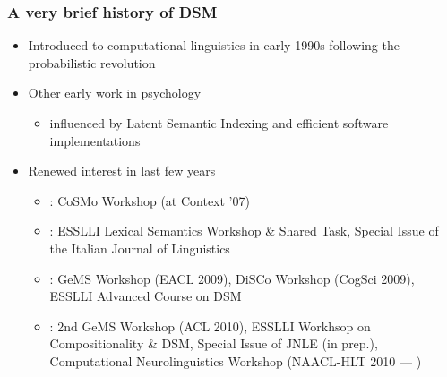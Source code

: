 \begin{frame}
  \frametitle{A very brief history of DSM}

  \begin{itemize}
  \item Introduced to computational linguistics in early 1990s
    following the probabilistic revolution \citep{Schuetze:92,Schuetze:98}
  \item Other early work in psychology \citep{Landauer:Dumais:97,Lund:Burgess:96}
    \begin{itemize}
    \item[\hand] influenced by Latent Semantic Indexing \citep{Dumais:etc:88} and efficient software implementations \citep{Berry:92}
    \end{itemize}
  \item<2-> Renewed interest in last few years
    \begin{itemize}
    \item<2-> : CoSMo Workshop (at Context '07)
    \item<3-> : ESSLLI Lexical Semantics Workshop \& Shared Task, Special Issue of the Italian Journal of Linguistics
    \item<4-> : GeMS Workshop (EACL 2009), DiSCo Workshop (CogSci 2009), ESSLLI Advanced Course on DSM
    \item<5-> : 2nd GeMS Workshop (ACL 2010), ESSLLI Workhsop on Compositionality \& DSM, Special Issue of JNLE (in prep.), Computational Neurolinguistics Workshop (NAACL-HLT 2010 --- )
    \end{itemize}
  \end{itemize}
\end{frame}

\begin{frame}
  \frametitle{}

\end{frame}

\subsection{}

\begin{frame}
  \frametitle{}

\end{frame}

\subsection{}

\begin{frame}
  \frametitle{}

\end{frame}



\begin{frame}[fragile]
  \frametitle{}

  \begin{alltt}
  \end{alltt}
\end{frame}

